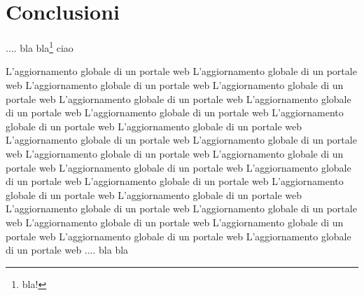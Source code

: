\chapter*{Conclusioni}

 .... bla bla\footnote{bla!}
ciao

L'aggiornamento globale di un portale web L'aggiornamento globale di un portale web L'aggiornamento globale di un portale web L'aggiornamento globale di un portale web L'aggiornamento globale di un portale web L'aggiornamento globale di un portale web L'aggiornamento globale di un portale web L'aggiornamento globale di un portale web L'aggiornamento globale di un portale web L'aggiornamento globale di un portale web L'aggiornamento globale di un portale web L'aggiornamento globale di un portale web L'aggiornamento globale di un portale web L'aggiornamento globale di un portale web L'aggiornamento globale di un portale web L'aggiornamento globale di un portale web L'aggiornamento globale di un portale web L'aggiornamento globale di un portale web L'aggiornamento globale di un portale web L'aggiornamento globale di un portale web L'aggiornamento globale di un portale web L'aggiornamento globale di un portale web L'aggiornamento globale di un portale web L'aggiornamento globale di un portale web
 .... bla bla